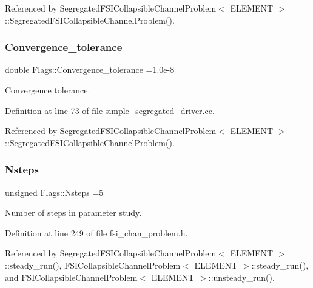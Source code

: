 Referenced by Segregated\+F\+S\+I\+Collapsible\+Channel\+Problem$<$ E\+L\+E\+M\+E\+N\+T $>$\+::\+Segregated\+F\+S\+I\+Collapsible\+Channel\+Problem().

\mbox{\label{namespaceFlags_a5550ee43b27fd03898a6718246b44e4a}} 
\subsubsection{\texorpdfstring{Convergence\+\_\+tolerance}{Convergence\_tolerance}}
{\footnotesize\ttfamily double Flags\+::\+Convergence\+\_\+tolerance =1.\+0e-\/8}



Convergence tolerance. 



Definition at line 73 of file simple\+\_\+segregated\+\_\+driver.\+cc.



Referenced by Segregated\+F\+S\+I\+Collapsible\+Channel\+Problem$<$ E\+L\+E\+M\+E\+N\+T $>$\+::\+Segregated\+F\+S\+I\+Collapsible\+Channel\+Problem().

\mbox{\label{namespaceFlags_a8a6ffdb261330ef89965624209ab7b00}} 
\subsubsection{\texorpdfstring{Nsteps}{Nsteps}}
{\footnotesize\ttfamily unsigned Flags\+::\+Nsteps =5}



Number of steps in parameter study. 



Definition at line 249 of file fsi\+\_\+chan\+\_\+problem.\+h.



Referenced by Segregated\+F\+S\+I\+Collapsible\+Channel\+Problem$<$ E\+L\+E\+M\+E\+N\+T $>$\+::steady\+\_\+run(), F\+S\+I\+Collapsible\+Channel\+Problem$<$ E\+L\+E\+M\+E\+N\+T $>$\+::steady\+\_\+run(), and F\+S\+I\+Collapsible\+Channel\+Problem$<$ E\+L\+E\+M\+E\+N\+T $>$\+::unsteady\+\_\+run().

\mbox{\label{namespaceFlags_a6c3895aecba834ceda5fe1c3ecb13bba}} 
